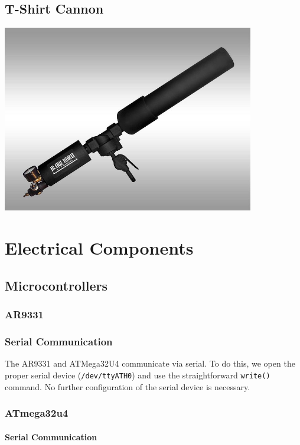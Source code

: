 \documentclass[letterpaper,12pt]{article}
\begin{document}
\subsection{T-Shirt Cannon}
\begin{center}
    \includegraphics[width=11cm]{pics/cannon/blowhard_cannon.jpg}
\end{center}

\section{Electrical Components}

\subsection{Microcontrollers}
\subsubsection{AR9331}

\subsubsection{Serial Communication}
\label{sec:ar9331_serial_com}
The AR9331 and ATMega32U4 communicate via serial. To do this, we open the proper serial device (\texttt{/dev/ttyATH0}) and use the straightforward \texttt{write()} command. No further configuration of the serial device is necessary.

\subsubsection{ATmega32u4}

\paragraph{Serial Communication}
\label{sec:atmega_serial_com}
\end{document}
